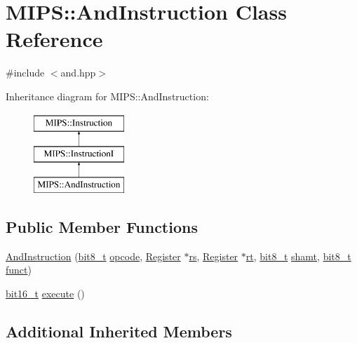 \hypertarget{classMIPS_1_1AndInstruction}{}\section{M\+I\+PS\+:\+:And\+Instruction Class Reference}
\label{classMIPS_1_1AndInstruction}


{\ttfamily \#include $<$and.\+hpp$>$}

Inheritance diagram for M\+I\+PS\+:\+:And\+Instruction\+:\begin{figure}[H]
\begin{center}
\leavevmode
\includegraphics[height=3.000000cm]{classMIPS_1_1AndInstruction}
\end{center}
\end{figure}
\subsection*{Public Member Functions}
\begin{DoxyCompactItemize}
\item 
\hyperlink{classMIPS_1_1AndInstruction_a9cc655d129040fe504607d0a3a06f942}{And\+Instruction} (\hyperlink{core_8hpp_a6074bae122ae7b527864eec42c728c3c}{bit8\+\_\+t} \hyperlink{classMIPS_1_1Instruction_a45cc6808b5dde8a5d41067d148b55476}{opcode}, \hyperlink{classMIPS_1_1Register}{Register} $\ast$\hyperlink{classMIPS_1_1InstructionI_a2be191d5b3dce505e2e626ec02eb4d62}{rs}, \hyperlink{classMIPS_1_1Register}{Register} $\ast$\hyperlink{classMIPS_1_1InstructionI_add1db07a5c954f35271de8c8a5737487}{rt}, \hyperlink{core_8hpp_a6074bae122ae7b527864eec42c728c3c}{bit8\+\_\+t} \hyperlink{classMIPS_1_1InstructionI_aa9b6da37c374c2ec8d96448d341e5e7d}{shamt}, \hyperlink{core_8hpp_a6074bae122ae7b527864eec42c728c3c}{bit8\+\_\+t} \hyperlink{classMIPS_1_1InstructionI_a5c6efcbbd233a7447c1fe24ea0a1e558}{funct})
\item 
\hyperlink{core_8hpp_adc265a970bc35995b5879784bbb3f1b7}{bit16\+\_\+t} \hyperlink{classMIPS_1_1AndInstruction_a24b2fdb68ff022275db4181e502b7a48}{execute} ()
\end{DoxyCompactItemize}
\subsection*{Additional Inherited Members}


